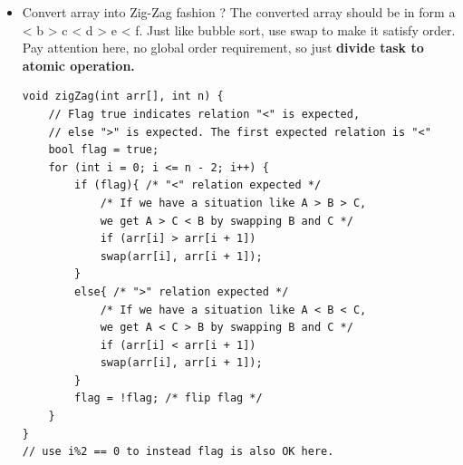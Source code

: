 \documentclass[a4paper,11pt,twoside]{book}
\begin{document}
\begin{itemize}
	\item Convert array into Zig-Zag fashion ? The converted array should be in form a < b > c < d > e < f. Just like bubble sort, use swap to make it satisfy order. Pay attention here, no global order requirement, so just \textbf{divide task to atomic operation. }
\begin{lstlisting}[breaklines]
void zigZag(int arr[], int n) {
	// Flag true indicates relation "<" is expected,
	// else ">" is expected. The first expected relation is "<"
	bool flag = true;	
	for (int i = 0; i <= n - 2; i++) {
		if (flag){ /* "<" relation expected */
			/* If we have a situation like A > B > C,
			we get A > C < B by swapping B and C */
			if (arr[i] > arr[i + 1])
			swap(arr[i], arr[i + 1]);
		}
		else{ /* ">" relation expected */
			/* If we have a situation like A < B < C,
			we get A < C > B by swapping B and C */
			if (arr[i] < arr[i + 1])
			swap(arr[i], arr[i + 1]);
		}
		flag = !flag; /* flip flag */
	}
}
// use i%2 == 0 to instead flag is also OK here. 
\end{lstlisting}

\end{itemize}
\end{document}
